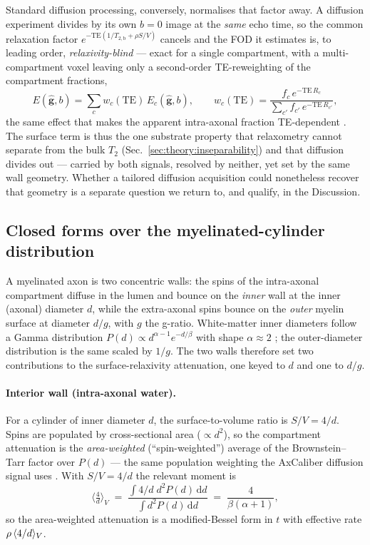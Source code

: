 Standard diffusion processing, conversely, normalises that factor away. A diffusion
experiment divides by its own $b{=}0$ image at the \emph{same} echo time, so the common
relaxation factor $e^{-\mathrm{TE}(1/T_{2,\mathrm b}+\rho S/V)}$ cancels and the FOD it
estimates is, to leading order, \emph{relaxivity-blind} --- exact for a single
compartment, with a multi-compartment voxel leaving only a second-order TE-reweighting of
the compartment fractions,
\begin{equation}
  E(\hat{\mathbf g},b)=\sum_c w_c(\mathrm{TE})\,E_c(\hat{\mathbf g},b),
  \qquad
  w_c(\mathrm{TE})=\frac{f_c\,e^{-\mathrm{TE}\,R_c}}{\sum_{c'} f_{c'}\,e^{-\mathrm{TE}\,R_{c'}}},
  \label{eq:te_weights}
\end{equation}
the same effect that makes the apparent intra-axonal fraction TE-dependent
\citep{Veraart2018}. The surface term is thus the one substrate property that relaxometry
cannot separate from the bulk $T_2$ (Sec.~\ref{sec:theory:inseparability}) and that
diffusion divides out --- carried by both signals, resolved by neither, yet set by the
same wall geometry. Whether a tailored diffusion acquisition could nonetheless recover
that geometry is a separate question we return to, and qualify, in the Discussion.

\subsection{Closed forms over the myelinated-cylinder distribution}
\label{sec:theory:closedforms}

A myelinated axon is two concentric walls: the spins of the intra-axonal
compartment diffuse in the lumen and bounce on the \emph{inner} wall at the inner
(axonal) diameter $d$, while the extra-axonal spins bounce on the \emph{outer}
myelin surface at diameter $d/g$, with $g$ the g-ratio. White-matter inner
diameters follow a Gamma distribution $P(d)\propto d^{\alpha-1}e^{-d/\beta}$ with
shape $\alpha\!\approx\!2$ \citep{Aboitiz1992, Assaf2008}; the outer-diameter
distribution is the same scaled by $1/g$. The two walls therefore set two
contributions to the surface-relaxivity attenuation, one keyed to $d$ and one to
$d/g$.

\paragraph{Interior wall (intra-axonal water).} For a cylinder of inner diameter
$d$, the surface-to-volume ratio is $S/V=4/d$. Spins are populated by
cross-sectional area ($\propto d^2$), so the compartment attenuation is the
\emph{area-weighted} (``spin-weighted'') average of the Brownstein--Tarr factor
over $P(d)$ --- the same population weighting the AxCaliber diffusion signal uses
\citep{Assaf2008}. With $S/V=4/d$ the relevant moment is
\begin{equation}
  \Big\langle \tfrac{4}{d}\Big\rangle_{V}
  \;=\; \frac{\int 4/d\;d^2 P(d)\,\mathrm dd}{\int d^2 P(d)\,\mathrm dd}
  \;=\; \frac{4}{\beta(\alpha+1)},
  \label{eq:area_moment}
\end{equation}
so the area-weighted attenuation is a modified-Bessel form in $t$ with effective
rate $\rho\,\langle 4/d\rangle_{V}$.

